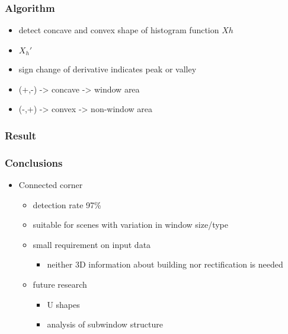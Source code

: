 \documentclass{beamer}
\begin{document}
\frame
{
	\frametitle{Algorithm}
	\begin{itemize}
	\item <+-| alert@+> detect concave and convex shape of histogram function $Xh$
	\item <+-| alert@+> $X_{h}'$ 
	\item <+-| alert@+> sign change of derivative indicates peak or valley
	\item <+-| alert@+> (+,-) -> concave -> window area
	\item <+-| alert@+> (-,+) -> convex -> non-window area
	\end{itemize}
}

\frame
{
	\frametitle{Result}
}

\frame
{
}

\frame
{
}

\frame
{
	\frametitle{Conclusions}
	\begin{itemize}
	\item <+-| alert@+> Connected corner
		\begin{itemize}
		\item <+-| alert@+> detection rate 97\%
		\item <+-| alert@+> suitable for scenes with variation in window size/type
		\item <+-| alert@+> small requirement on input data
			\begin{itemize}
			\item <+-| alert@+> neither 3D information about building nor rectification is needed
			\end{itemize}
		\item <+-| alert@+> future research
			\begin{itemize}			
			\item <+-| alert@+> U shapes 
			\item <+-| alert@+> analysis of subwindow structure
			\end{itemize}			
		\end{itemize}
	\end{itemize}
}

\frame
{
}
\end{document}
